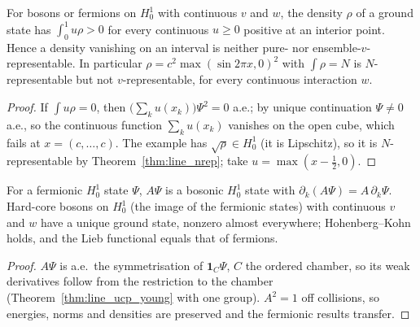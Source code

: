 \begin{theorem}
  \label{thm:line_not_vrep}
  \leanok
  For bosons or fermions on $H^1_0$ with continuous $v$ and $w$, the density $\rho$ of a ground state has
  $\int_0^1 u\rho>0$ for every continuous $u\ge0$ positive at an interior point. Hence a density vanishing on an
  interval is neither pure- nor ensemble-$v$-representable. In particular $\rho=c^2\max(\sin2\pi x,0)^2$ with
  $\int\rho=N$ is $N$-representable but not $v$-representable, for every continuous interaction $w$.
\end{theorem}
\begin{proof}
  \leanok
  If $\int u\rho=0$, then $\big(\sum_k u(x_k)\big)\Psi^2=0$ a.e.; by unique continuation $\Psi\ne0$ a.e., so the
  continuous function $\sum_k u(x_k)$ vanishes on the open cube, which fails at $x=(c,\dots,c)$. The example has
  $\sqrt\rho\in H^1_0$ (it is Lipschitz), so it is $N$-representable by Theorem~\ref{thm:line_nrep}; take
  $u=\max(x-\tfrac12,0)$.
\end{proof}

\begin{theorem}
  \label{thm:line_hardcore_W}
  \leanok
  For a fermionic $H^1_0$ state $\Psi$, $A\Psi$ is a bosonic $H^1_0$ state with $\partial_k(A\Psi)=A\,\partial_k\Psi$. Hard-core
  bosons on $H^1_0$ (the image of the fermionic states) with continuous $v$ and $w$ have a unique ground state, nonzero
  almost everywhere; Hohenberg--Kohn holds, and the Lieb functional equals that of fermions.
\end{theorem}
\begin{proof}
  \leanok
  $A\Psi$ is a.e.\ the symmetrisation of $\mathbf 1_C\Psi$, $C$ the ordered chamber, so its weak derivatives follow from
  the restriction to the chamber (Theorem~\ref{thm:line_ucp_young} with one group). $A^2=1$ off collisions, so energies,
  norms and densities are preserved and the fermionic results transfer.
\end{proof}

